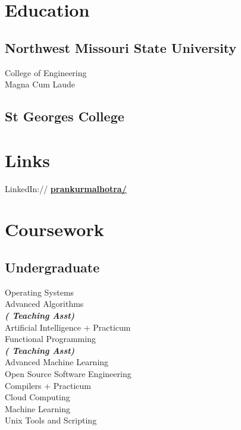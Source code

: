 \documentclass[]{deedy-resume-openfont}
\begin{document}
\begin{minipage}[t]{0.33\textwidth}

\section{Education} 


\subsection{Northwest Missouri \newline State University}
College of Engineering \\
Magna Cum Laude\\
\sectionsep

\subsection{St Georges College}
\sectionsep


\section{Links} 

LinkedIn://  \href{https://www.linkedin.com/in/prankurmalhotra/}{\bf prankurmalhotra/} \\


\section{Coursework}


\subsection{Undergraduate}
Operating Systems \\
Advanced Algorithms \\
{\footnotesize \textit{\textbf{( Teaching Asst) }}} \\
Artificial Intelligence + Practicum \\
Functional Programming \\
{\footnotesize \textit{\textbf{( Teaching Asst) }}} \\
Advanced Machine Learning \\
Open Source Software Engineering \\
Compilers + Practicum \\
Cloud Computing \\
Machine Learning \\
Unix Tools and Scripting \\




\end{minipage}
\end{document}
